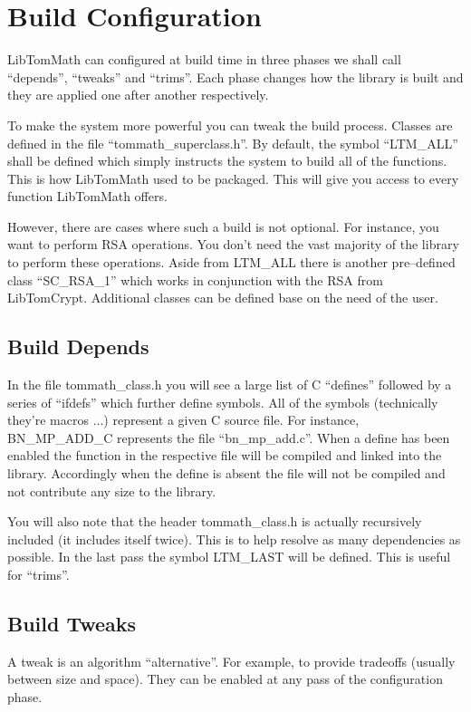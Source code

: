 \documentclass[synpaper]{book}
\begin{document}
\section{Build Configuration}
LibTomMath can configured at build time in three phases we shall call ``depends'', ``tweaks'' and ``trims''.
Each phase changes how the library is built and they are applied one after another respectively.

To make the system more powerful you can tweak the build process.  Classes are defined in the file
``tommath\_superclass.h''.  By default, the symbol ``LTM\_ALL'' shall be defined which simply
instructs the system to build all of the functions.  This is how LibTomMath used to be packaged.  This will give you
access to every function LibTomMath offers.

However, there are cases where such a build is not optional.  For instance, you want to perform RSA operations.  You
don't need the vast majority of the library to perform these operations.  Aside from LTM\_ALL there is
another pre--defined class ``SC\_RSA\_1'' which works in conjunction with the RSA from LibTomCrypt.  Additional
classes can be defined base on the need of the user.

\subsection{Build Depends}
In the file tommath\_class.h you will see a large list of C ``defines'' followed by a series of ``ifdefs''
which further define symbols.  All of the symbols (technically they're macros $\ldots$) represent a given C source
file.  For instance, BN\_MP\_ADD\_C represents the file ``bn\_mp\_add.c''.  When a define has been enabled the
function in the respective file will be compiled and linked into the library.  Accordingly when the define
is absent the file will not be compiled and not contribute any size to the library.

You will also note that the header tommath\_class.h is actually recursively included (it includes itself twice).
This is to help resolve as many dependencies as possible.  In the last pass the symbol LTM\_LAST will be defined.
This is useful for ``trims''.

\subsection{Build Tweaks}
A tweak is an algorithm ``alternative''.  For example, to provide tradeoffs (usually between size and space).
They can be enabled at any pass of the configuration phase.
\end{document}
